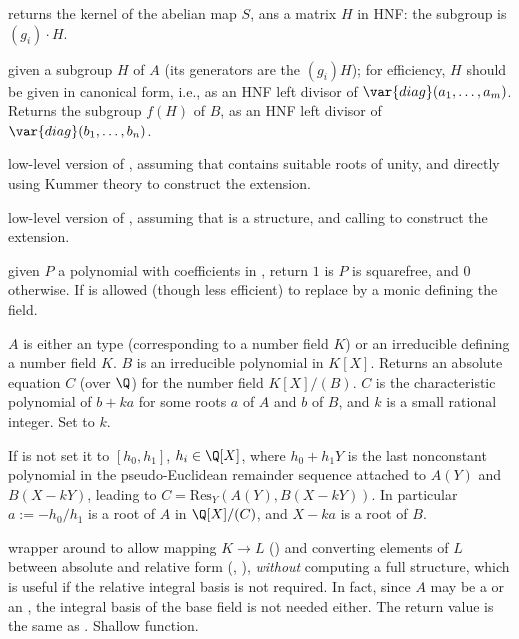  returns the kernel of the abelian map $S$,
ans a matrix $H$ in HNF: the subgroup is $(g_i)\cdot H$.

 given a subgroup $H$ of
$A$ (its generators are the $(g_i) H$); for efficiency, $H$ should be given in
canonical form, i.e., as an HNF left divisor of $\var{diag}(a_1,\dots,a_m)$.
Returns the subgroup $f(H)$ of $B$, as an HNF left divisor of
$\var{diag}(b_1,\dots,b_n)$.


low-level version of , assuming that  contains
suitable roots of unity, and directly using Kummer theory to construct the
extension.

low-level version of , assuming that  is a
 structure, and calling  to construct the extension.


 given $P$ a polynomial with
coefficients in , return $1$ is $P$ is squarefree, and $0$
otherwise. If is allowed (though less efficient) to replace 
by a monic  defining the field.

 $A$ is either an
 type (corresponding to a number field $K$) or an irreducible 
defining a number field $K$. $B$ is an irreducible polynomial in $K[X]$.
Returns an absolute equation $C$ (over $\Q$) for the number field $K[X]/(B)$.
$C$ is the characteristic polynomial of $b + k a$ for some roots $a$ of $A$
and $b$ of $B$, and $k$ is a small rational integer. Set  to $k$.

If  is not  set it to $[h_0, h_1]$, $h_i\in \Q[X]$,
where $h_0+h_1 Y$ is the last nonconstant polynomial in the pseudo-Euclidean
remainder sequence attached to $A(Y)$ and $B(X-kY)$, leading to $C =
\text{Res}_Y(A(Y), B(X-kY))$. In particular $a := -h_0/h_1$ is a root of $A$
in $\Q[X]/(C)$, and $X - ka$ is a root of $B$.

 wrapper around  to allow
mapping $K\to L$ () and converting elements of $L$
between absolute and relative form (, ),
\emph{without} computing a full  structure, which is useful if the
relative integral basis is not required. In fact, since $A$ may be a 
or an , the integral basis of the base field is not needed either. The
return value is the same as . Shallow function.

